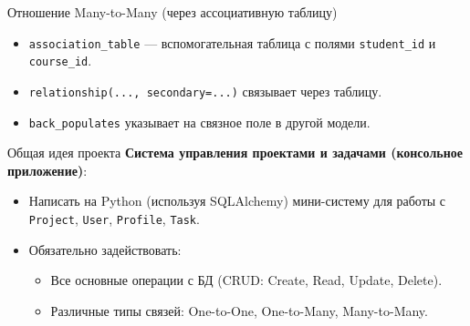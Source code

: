\documentclass{beamer}
\begin{document}
\begin{frame}[fragile]{Отношение Many-to-Many (через ассоциативную таблицу)}
	\begin{itemize}
		\item \texttt{association\_table} — вспомогательная таблица с полями \texttt{student\_id} и \texttt{course\_id}.
		\item \texttt{relationship(..., secondary=...)} связывает через таблицу.
		\item \texttt{back\_populates} указывает на связное поле в другой модели.
	\end{itemize}
\end{frame}
\begin{frame}{Общая идея проекта}
	\textbf{Система управления проектами и задачами (консольное приложение)}:
	\begin{itemize}
		\item Написать на Python (используя SQLAlchemy) мини-систему для работы с
		      \texttt{Project}, \texttt{User}, \texttt{Profile}, \texttt{Task}.
		\item Обязательно задействовать:
		      \begin{itemize}
			      \item Все основные операции с БД (CRUD: Create, Read, Update, Delete).
			      \item Различные типы связей: One-to-One, One-to-Many, Many-to-Many.
		      \end{itemize}
	\end{itemize}
\end{frame}
\end{document}
